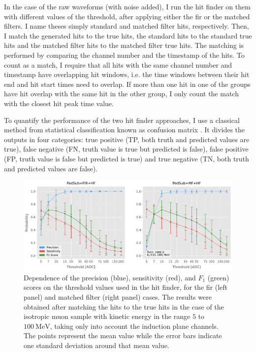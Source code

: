 In the case of the raw waveforms (with noise added), I run the hit finder on them with different values of the threshold, after applying either the \gls{fir} or the matched filters. I name theses simply standard and matched filter hits, respectively. Then, I match the generated hits to the true hits, the standard hits to the standard true hits and the matched filter hits to the matched filter true hits. The matching is performed by comparing the channel number and the timestamp of the hits. To count as a match, I require that all hits with the same channel number and timestamp have overlapping hit windows, i.e. the time windows between their hit end and hit start times need to overlap. If more than one hit in one of the groups have hit overlap with the same hit in the other group, I only count the match with the closest hit peak time value.

To quantify the performance of the two hit finder approaches, I use a classical method from statistical classification known as confusion matrix \cite{Stehman1997}. It divides the outputs in four categories: true positive (TP, both truth and predicted values are true), false negative (FN, truth value is true but predicted is false), false positive (FP, truth value is false but predicted is true) and true negative (TN, both truth and predicted values are false).

\begin{figure}[t]
	\centering
	\includegraphics[width=.99\linewidth]{Images/Matched_Filter/hit_study_muon_scores_indct}
	\caption[Dependence of the precision, sensitivity, and $F_{1}$ scores on the threshold values used in the hit finder for the \gls{fir} and matched filters.]{Dependence of the precision (blue), sensitivity (red), and $F_{1}$ (green) scores on the threshold values used in the hit finder, for the \gls{fir} (left panel) and matched filter (right panel) cases. The results were obtained after matching the hits to the true hits in the case of the isotropic muon sample with kinetic energy in the range $5$ to $100 \ \mathrm{MeV}$, taking only into account the induction plane channels. The points represent the mean value while the error bars indicate one standard deviation around that mean value.}
	\label{fig:threshold_opt}
\end{figure}

